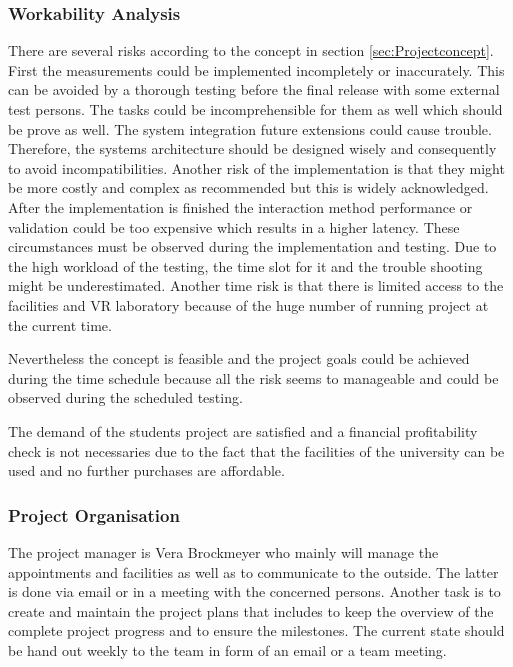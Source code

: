 \subsubsection{Workability Analysis}\label{sec:PMworkabilityAnalysis}

There are several risks according to the concept in section \ref{sec:Projectconcept}. First the measurements could be implemented incompletely or inaccurately. This can be avoided by a thorough testing before the final release with some external test persons. The tasks could be incomprehensible for them as well which should be prove as well.
The system integration future extensions could cause trouble. Therefore, the systems architecture should be designed wisely and consequently to avoid incompatibilities. Another risk of the implementation is that they might be more costly and complex as recommended but this is widely acknowledged. After the implementation is finished the interaction method performance or validation could be too expensive which results in a higher latency. These circumstances must be observed during the implementation and testing. Due to the high workload of the testing, the time slot for it and the trouble shooting might be underestimated. Another time risk is that there is limited access to the facilities and VR laboratory because of the huge number of running project at the current time.

Nevertheless the concept is feasible and the project goals could be achieved during the time schedule because all the risk seems to manageable and could be observed during the scheduled testing.

The demand of the students project are satisfied and a financial profitability check is not necessaries due to the fact that the facilities of the university can be used and no further purchases are affordable.


\subsubsection{Project Organisation}\label{sec:PMProjectOrganisation}

The project manager is Vera Brockmeyer who mainly will manage the appointments and facilities as well as to communicate to the outside. The latter is done via email or in a meeting with the concerned persons. Another task is to create and maintain the project plans that includes to keep the overview of the complete project progress and to ensure the milestones.
The current state should be hand out weekly to the team in form of an email or a team meeting.

